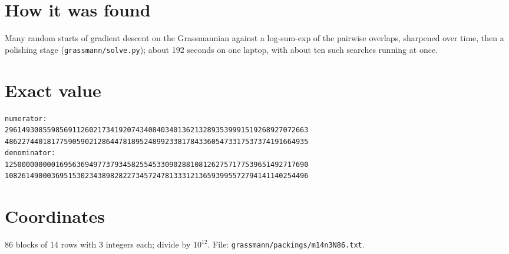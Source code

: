 \documentclass[11pt,a4paper]{article}
\begin{document}
\section{How it was found}
Many random starts of gradient descent on the Grassmannian against a log-sum-exp of the pairwise overlaps, sharpened over time, then a polishing stage (\texttt{grassmann/solve.py}); about 192 seconds on one laptop, with about ten such searches running at once.


\appendix
\section{Exact value}
{\small
\begin{verbatim}
numerator:
296149308559856911260217341920743408403401362132893539991519268927072663
486227440181775905902128644781895248992338178433605473317537374191664935
denominator:
125000000000169563694977379345825545330902881081262757177539651492717690
108261490003695153023438982822734572478133312136593995572794141140254496
\end{verbatim}}

\section{Coordinates}
86 blocks of 14 rows with 3 integers each; divide by $10^{12}$. File: \texttt{grassmann/packings/m14n3N86.txt}.
{\tiny
\begin{multicols}{3}
\end{multicols}}
\end{document}
